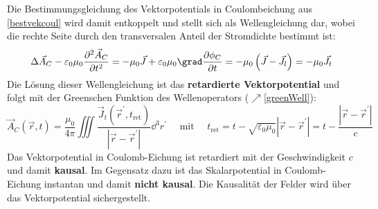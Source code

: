 Die Bestimmungsgleichung des Vektorpotentials in Coulombeichung aus \ref{bestvekcoul}
wird damit entkoppelt und stellt sich als Wellengleichung dar, wobei die rechte Seite durch den transversalen Anteil der Stromdichte bestimmt ist:
\begin{equation}
	\Delta \vec{{A}}_{{C}}-\varepsilon_{0} \mu_{0} \frac{\partial^{2} \vec{{A}}_{{C}}}{\partial {t}^{2}}=-\mu_{0} \vec{{J}}+\varepsilon_{0} \mu_{0} \grad \frac{\partial \phi_{{C}}}{\partial {t}}=-\mu_{0}\left(\vec{{J}}-\vec{{J}}_{l}\right)=-\mu_{0} \vec{{J}}_{{t}} 
\end{equation}
 Die Lösung dieser Wellengleichung ist das \textbf{retardierte Vektorpotential} und folgt mit der Greenschen Funktion des Wellenoperators ($\nearrow$\ref{greenWell}):
\begin{equation}\label{vekpotcoul}
	\boxed{\vec{{A}}_{{C}}(\vec{{r}}, {t})=\frac{\mu_{0}}{4 \pi} \iiint \frac{\vec{{J}}_{{t}}\left(\vec{{r}}^{\prime}, {t}_{\text{ret}}\right)}{\left|\vec{{r}}-\vec{{r}}^{\prime}\right|} \dd^3 {r}^{\prime}} \quad\text { mit }\quad {t}_{\text{ret}}={t}-\sqrt{\varepsilon_{0} \mu_{0}}\left|\vec{{r}}-\vec{{r}}^{\prime}\right|={t}-\frac{\left|\vec{{r}}-\vec{{r}}^{\prime}\right|}{{c}} 
\end{equation}
Das Vektorpotential in Coulomb-Eichung ist retardiert mit der Geschwindigkeit $c$ und damit \textbf{kausal}. Im Gegensatz dazu ist das Skalarpotential in Coulomb-Eichung instantan und damit \textbf{nicht kausal}. Die Kausalität der Felder wird über das Vektorpotential sichergestellt.
